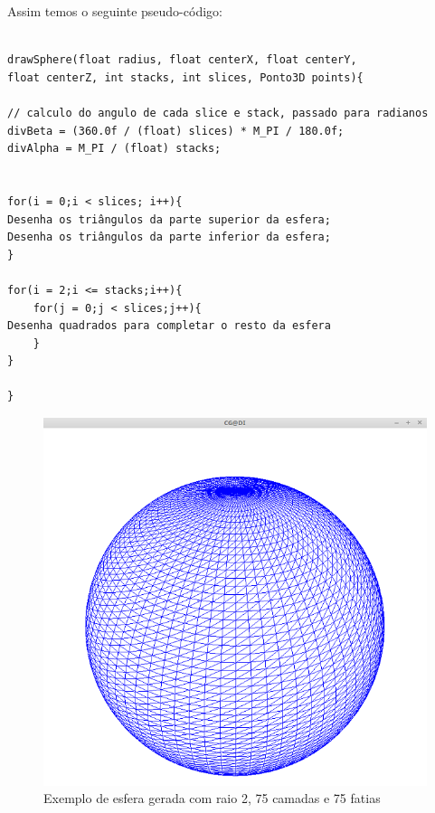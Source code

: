  
Assim temos o seguinte pseudo-código:

\begin{Verbatim}

drawSphere(float radius, float centerX, float centerY,
float centerZ, int stacks, int slices, Ponto3D points){

// calculo do angulo de cada slice e stack, passado para radianos
divBeta = (360.0f / (float) slices) * M_PI / 180.0f;
divAlpha = M_PI / (float) stacks;  


for(i = 0;i < slices; i++){
Desenha os triângulos da parte superior da esfera;
Desenha os triângulos da parte inferior da esfera;
}

for(i = 2;i <= stacks;i++){
	for(j = 0;j < slices;j++){
Desenha quadrados para completar o resto da esfera
	}
}

}

\end{Verbatim}

\begin{figure}[<+htpb+>]
	\centering
	\includegraphics[scale=0.5]{imagens/p3_esfera_2_75_75.png}
	\caption{Exemplo de esfera gerada com raio 2, 75 camadas e 75 fatias}
	\label{p1:fig:p3_esfera_2_20_20}
\end{figure}




